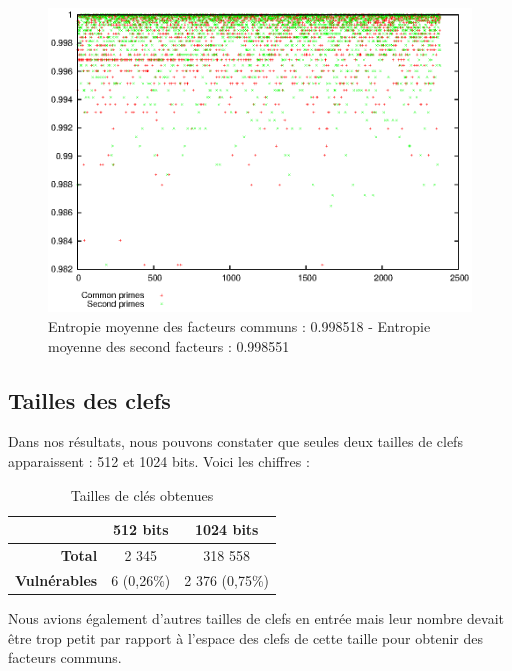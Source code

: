 \begin{figure}[H]
\centering
\includegraphics[width=16cm]{images/entropyprimes.eps}
\caption[Entropie moyenne]{Entropie moyenne des facteurs communs : 0.998518 - Entropie moyenne des second facteurs : 0.998551}
\label{entropiePrime}
\end{figure}


\subsection{Tailles des clefs}
Dans nos résultats, nous pouvons constater que seules deux tailles de clefs apparaissent : 512 et 1024 bits. Voici les chiffres :


\begin{table}[H]
\centering
\begin{tabular}{|r|c|c|}
\hline
\textbf{}&\textbf{512 bits}&\textbf{1024 bits}\\
\hline
\textbf{Total}&2 345&318 558\\
\hline
\textbf{Vulnérables}&6 (0,26\%)&2 376 (0,75\%)\\
\hline
\end{tabular}
\caption{Tailles de clés obtenues}
\label{tailles}
\end{table}


Nous avions également d'autres tailles de clefs en entrée mais leur nombre devait être trop petit par rapport à l'espace des clefs de cette taille pour obtenir des facteurs communs.


